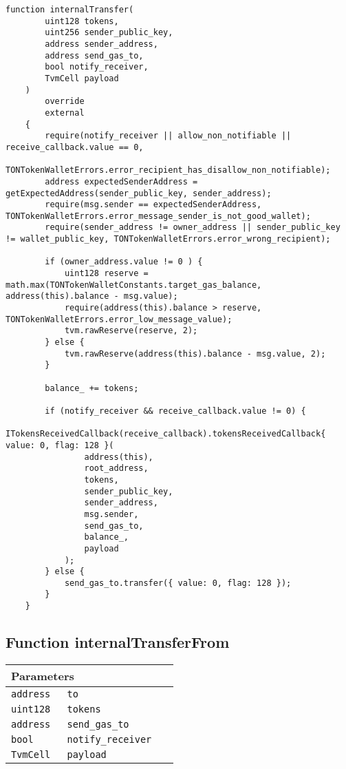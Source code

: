 \begin{lstlisting}[firstnumber=370]
    function internalTransfer(
        uint128 tokens,
        uint256 sender_public_key,
        address sender_address,
        address send_gas_to,
        bool notify_receiver,
        TvmCell payload
    )
        override
        external
    {
        require(notify_receiver || allow_non_notifiable || receive_callback.value == 0,
                TONTokenWalletErrors.error_recipient_has_disallow_non_notifiable);
        address expectedSenderAddress = getExpectedAddress(sender_public_key, sender_address);
        require(msg.sender == expectedSenderAddress, TONTokenWalletErrors.error_message_sender_is_not_good_wallet);
        require(sender_address != owner_address || sender_public_key != wallet_public_key, TONTokenWalletErrors.error_wrong_recipient);

        if (owner_address.value != 0 ) {
            uint128 reserve = math.max(TONTokenWalletConstants.target_gas_balance, address(this).balance - msg.value);
            require(address(this).balance > reserve, TONTokenWalletErrors.error_low_message_value);
            tvm.rawReserve(reserve, 2);
        } else {
            tvm.rawReserve(address(this).balance - msg.value, 2);
        }

        balance_ += tokens;

        if (notify_receiver && receive_callback.value != 0) {
            ITokensReceivedCallback(receive_callback).tokensReceivedCallback{ value: 0, flag: 128 }(
                address(this),
                root_address,
                tokens,
                sender_public_key,
                sender_address,
                msg.sender,
                send_gas_to,
                balance_,
                payload
            );
        } else {
            send_gas_to.transfer({ value: 0, flag: 128 });
        }
    }
\end{lstlisting}

\subsection{Function internalTransferFrom}


\ifsoltables
\noindent\begin{tabular}{|l|l|p{5cm}|}\hline
\multicolumn{3}{|l|}{\bf Parameters}\\\hline
\tt address & \tt to &\\\hline
\tt uint128 & \tt tokens &\\\hline
\tt address & \tt send\_{}gas\_{}to &\\\hline
\tt bool & \tt notify\_{}receiver &\\\hline
\tt TvmCell & \tt payload &\\\hline
\end{tabular}
\fi

